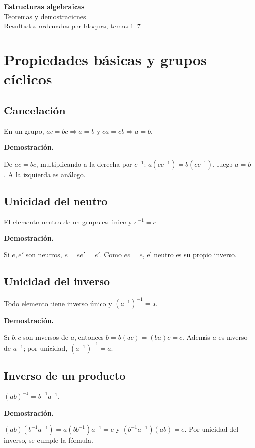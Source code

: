 \documentclass[11pt,a4paper]{article}
\begin{document}
\begin{center}{\LARGE\bfseries Estructuras algebraicas}\\[.4em]{\Large Teoremas y demostraciones}\\[.4em]{\large Resultados ordenados por bloques, temas 1--7}\end{center}
\tableofcontents\newpage
\section{Propiedades básicas y grupos cíclicos}

\subsection{Cancelación}
\begin{resultado}
En un grupo, $ac=bc\Rightarrow a=b$ y $ca=cb\Rightarrow a=b$.
\end{resultado}
\textbf{Demostración.}
\begin{demostracion}
De $ac=bc$, multiplicando a la derecha por $c^{-1}$: $a(cc^{-1})=b(cc^{-1})$, luego $a=b$. A la izquierda es análogo.
\end{demostracion}


\subsection{Unicidad del neutro}
\begin{resultado}
El elemento neutro de un grupo es único y $e^{-1}=e$.
\end{resultado}
\textbf{Demostración.}
\begin{demostracion}
Si $e,e\prime$ son neutros, $e=e e\prime=e\prime$. Como $ee=e$, el neutro es su propio inverso.
\end{demostracion}


\subsection{Unicidad del inverso}
\begin{resultado}
Todo elemento tiene inverso único y $(a^{-1})^{-1}=a$.
\end{resultado}
\textbf{Demostración.}
\begin{demostracion}
Si $b,c$ son inversos de $a$, entonces $b=b(ac)=(ba)c=c$. Además $a$ es inverso de $a^{-1}$; por unicidad, $(a^{-1})^{-1}=a$.
\end{demostracion}


\subsection{Inverso de un producto}
\begin{resultado}
$(ab)^{-1}=b^{-1}a^{-1}$.
\end{resultado}
\textbf{Demostración.}
\begin{demostracion}
$(ab)(b^{-1}a^{-1})=a(bb^{-1})a^{-1}=e$ y $(b^{-1}a^{-1})(ab)=e$. Por unicidad del inverso, se cumple la fórmula.
\end{demostracion}
\end{document}
